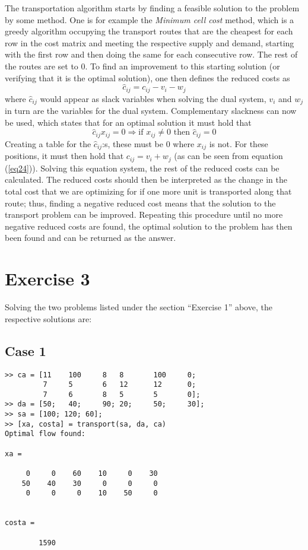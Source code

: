 \documentclass{article}
\begin{document}
  \noindent
  The transportation algorithm starts by finding a feasible solution to the
  problem by some method. One is for example the \textit{Minimum cell cost}
  method, which is a greedy algorithm occupying the transport routes that are
  the cheapest for each row in the cost matrix and meeting the respective
  supply and demand, starting with the first row and then doing the same for
  each consecutive row. The rest of the routes are set to 0.
  To find an improvement to this starting solution (or verifying that it is the
  optimal solution), one then defines the reduced costs as
  \begin{equation}
    \hat{c}_{ij} = c_{ij} - v_i - w_j
    \label{eq24}
  \end{equation}
  where $\hat{c}_{ij}$ would appear as slack variables when solving the dual
  system, $v_i$ and $w_j$ in turn are the variables for the dual system.
  Complementary slackness can now be used, which states that for an optimal
  solution it must hold that
  \begin{equation}
    \hat{c}_{ij}x_{ij} = 0 \Rightarrow \text{if } x_{ij} \neq 0 \text{ then } \hat{c}_{ij} = 0
  \end{equation}
  Creating a table for the $\hat{c}_{ij}$:s, these must be 0 where $x_{ij}$ is
  not. For these positions, it must then hold that $c_{ij} = v_i + w_j$ (as can
  be seen from equation (\ref{eq24})). Solving this equation system, the rest
  of the reduced costs can be calculated. The reduced costs should then be
  interpreted as the change in the total cost that we are optimizing for if one
  more unit is transported along that route; thus, finding a negative reduced
  cost means that the solution to the transport problem can be improved.
  Repeating this procedure until no more negative reduced costs are found, the
  optimal solution to the problem has then been found and can be returned as
  the answer.

  \section*{Exercise 3}
  Solving the two problems listed under the section ``Exercise 1'' above, the
  respective solutions are:

  \subsection*{Case 1}
  \begin{lstlisting}
>> ca = [11    100     8   8       100     0;
         7     5       6   12      12      0;
         7     6       8   5       5       0];
>> da = [50;   40;     90; 20;     50;     30];
>> sa = [100; 120; 60];
>> [xa, costa] = transport(sa, da, ca)
Optimal flow found:

xa =

     0     0    60    10     0    30
    50    40    30     0     0     0
     0     0     0    10    50     0


costa =

        1590
  \end{lstlisting}
\end{document}
